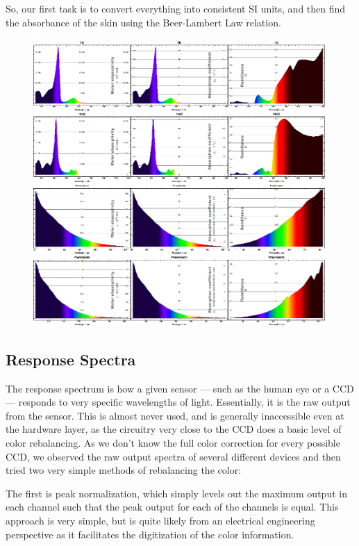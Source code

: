 So, our first task is to convert everything into consistent SI units, and then find the absorbance of the skin using the Beer-Lambert Law relation.

\begin{figure}[h!]
  \centering
    \includegraphics[width=0.99\textwidth]{Chapter1/Figs/ChemicalSpectralProperties.eps}
    \caption{ }  \label{fig:ChemicalSpectralProperties}
\end{figure}

\subsection{Response Spectra}

The response spectrum is how a given sensor --- such as the human eye or a CCD --- responds to very specific wavelengths of light. Essentially, it is the raw output from the sensor. This is almost never used, and is generally inaccessible even at the hardware layer, as the circuitry very close to the CCD does a basic level of color rebalancing. As we don't know the full color correction for every possible CCD, we observed the raw output spectra of several different devices and then tried two very simple methods of rebalancing the color:

The first is peak normalization, which simply levels out the maximum output in each channel such that the peak output for each of the channels is equal. This approach is very simple, but is quite likely from an electrical engineering perspective as it facilitates the digitization of the color information.

